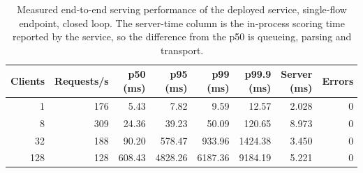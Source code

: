 \begin{table}[htbp]
\centering
\caption{Measured end-to-end serving performance of the deployed service, single-flow endpoint, closed loop. The server-time column is the in-process scoring time reported by the service, so the difference from the p50 is queueing, parsing and transport.}
\label{tab:serving}
\scriptsize
\begin{tabular}{rrrrrrrr}
\hline
Clients & Requests/s & p50 (ms) & p95 (ms) & p99 (ms) & p99.9 (ms) & Server (ms) & Errors \\
\hline
1 & 176 & 5.43 & 7.82 & 9.59 & 12.57 & 2.028 & 0 \\
8 & 309 & 24.36 & 39.23 & 50.09 & 120.65 & 8.973 & 0 \\
32 & 188 & 90.20 & 578.47 & 933.96 & 1424.38 & 3.450 & 0 \\
128 & 128 & 608.43 & 4828.26 & 6187.36 & 9184.19 & 5.221 & 0 \\
\hline
\end{tabular}
\end{table}
